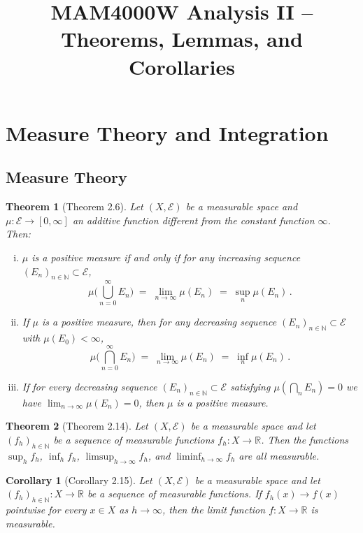 \documentclass{article}
\theoremstyle{plain}
\newtheorem*{theorem*}{Theorem}
\newtheorem*{corollary*}{Corollary}
\begin{document}
\title{MAM4000W Analysis II – Theorems, Lemmas, and Corollaries}
\author{}
\date{}
\maketitle

\tableofcontents

\section{Measure Theory and Integration}

\subsection*{Measure Theory}
\begin{theorem*}[Theorem 2.6]
Let $(X, \mathcal{E})$ be a measurable space and $\mu: \mathcal{E} \to [0,\infty]$ an additive function different from the constant function $\infty$. Then:
\begin{enumerate}[(i)]
\item $\mu$ is a positive measure if and only if for any increasing sequence $(E_n)_{n\in\mathbb{N}} \subset \mathcal{E}$, 
\[
\mu\Big(\bigcup_{n=0}^{\infty} E_n\Big) \;=\; \lim_{n\to\infty}\mu(E_n) \;=\; \sup_{n}\mu(E_n)\,. 
\]
\item If $\mu$ is a positive measure, then for any decreasing sequence $(E_n)_{n\in\mathbb{N}} \subset \mathcal{E}$ with $\mu(E_0)<\infty$, 
\[
\mu\Big(\bigcap_{n=0}^{\infty} E_n\Big) \;=\; \lim_{n\to\infty}\mu(E_n) \;=\; \inf_{n}\mu(E_n)\,. 
\]
\item If for every decreasing sequence $(E_n)_{n\in\mathbb{N}} \subset \mathcal{E}$ satisfying $\mu(\bigcap_{n} E_n)=0$ we have $\lim_{n\to\infty}\mu(E_n)=0$, then $\mu$ is a positive measure.
\end{enumerate}
\end{theorem*}

\begin{theorem*}[Theorem 2.14]
Let $(X, \mathcal{E})$ be a measurable space and let $(f_h)_{h\in\mathbb{N}}$ be a sequence of measurable functions $f_h: X\to \mathbb{R}$. Then the functions $\sup_{h} f_h$, $\inf_{h} f_h$, $\limsup_{h\to\infty} f_h$, and $\liminf_{h\to\infty} f_h$ are all measurable.
\end{theorem*}

\begin{corollary*}[Corollary 2.15]
Let $(X, \mathcal{E})$ be a measurable space and let $(f_h)_{h\in\mathbb{N}}: X \to \mathbb{R}$ be a sequence of measurable functions. If $f_h(x) \to f(x)$ pointwise for every $x \in X$ as $h \to \infty$, then the limit function $f: X \to \mathbb{R}$ is measurable.
\end{corollary*}
\end{document}
